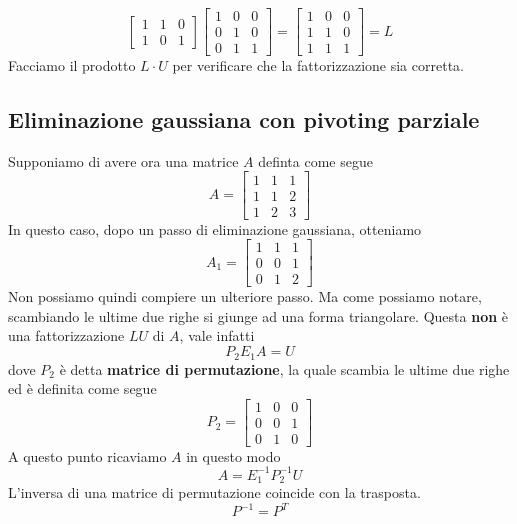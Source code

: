 \begin{example}
\[\begin{bmatrix}
			1 & 1 & 0 \\
			1 & 0 & 1
		\end{bmatrix} \begin{bmatrix}
			1 & 0 & 0 \\
			0 & 1 & 0 \\
			0 & 1 & 1
		\end{bmatrix} = \begin{bmatrix}
			1 & 0 & 0 \\
			1 & 1 & 0 \\
			1 & 1 & 1
		\end{bmatrix} = L
	\]
	Facciamo il prodotto $L \cdot U$ per verificare che la fattorizzazione sia corretta.
\end{example}

\subsection{Eliminazione gaussiana con pivoting parziale}
Supponiamo di avere ora una matrice $A$ definta come segue
\[
	A = \begin{bmatrix}
		1 & 1 & 1 \\
		1 & 1 & 2 \\
		1 & 2 & 3
	\end{bmatrix}
\]
In questo caso, dopo un passo di eliminazione gaussiana, otteniamo
\[
	A_1 = \begin{bmatrix}
		1 & 1 & 1 \\
		0 & 0 & 1 \\
		0 & 1 & 2
	\end{bmatrix}
\]
Non possiamo quindi compiere un ulteriore passo. Ma come possiamo notare, scambiando le ultime due righe
si giunge ad una forma triangolare. Questa \textbf{non} è una fattorizzazione $LU$ di $A$, vale infatti
\[ P_2 E_1 A = U \]
dove $P_2$ è detta \textbf{matrice di permutazione}, la quale scambia le ultime due righe ed è definita come
segue
\[
	P_2 = \begin{bmatrix}
		1 & 0 & 0 \\
		0 & 0 & 1 \\
		0 & 1 & 0
	\end{bmatrix}
\]
A questo punto ricaviamo $A$ in questo modo
\[ A = E_1^{-1} P_2^{-1} U \]
L'inversa di una matrice di permutazione coincide con la trasposta.
\[ P^{-1} = P^T \]

